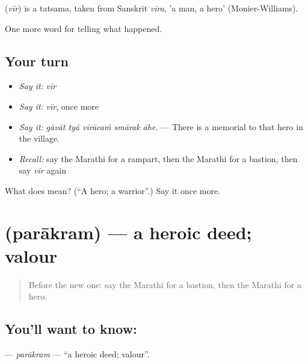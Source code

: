 \begin{cousinweb}
\textbf{} (\emph{vīr}) is a tatsama, taken from Sanskrit \emph{vīra}, 'a man, a hero' (Monier-Williams).
\end{cousinweb}

\begin{grammarlens}[title={What you've built}]
One more word for telling what happened.
\end{grammarlens}

\subsection*{Your turn}
\begin{itemize}
\raggedright
  \item \emph{Say it:} \emph{vīr}
  \item \emph{Say it:} \emph{vīr}, once more
  \item \emph{Say it:} \emph{gāvāt tyā vīrācaṁ smārak āhe.} — There is a memorial to that hero in the village.
  \item \emph{Recall:} say the Marathi for a rampart, then the Marathi for a bastion, then say \emph{vīr} again
\end{itemize}

\begin{tcolorbox}[breakable,colback=teal!4,colframe=teal!35!black,title={Before you move on}]
What does  mean? (\textquotedblleft{}A hero; a warrior\textquotedblright{}.) Say it once more.
\end{tcolorbox}
\section[\texorpdfstring{\mr{पराक्रम} (parākram)}{पराक्रम (parākram)}]{ (parākram) — a heroic deed; valour}

\label{lesson:MR-C332-parakram}



\begin{quote}
Before the new one: say the Marathi for a bastion, then the Marathi for a hero.
\end{quote}

\subsection*{You'll want to know: }
\textbf{} — \emph{parākram} — \textquotedblleft{}a heroic deed; valour\textquotedblright{}.

